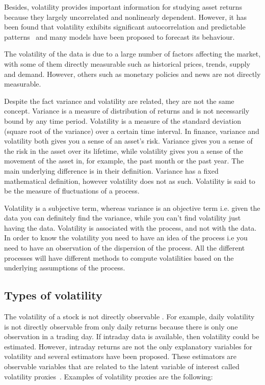 Besides, volatility provides important information for studying asset returns
because they largely uncorrelated and nonlinearly dependent. However,
it has been found that volatility exhibits significant autocorrelation and
predictable patterns~\cite{poon+granger2003} and  many models have been
proposed to forecast its behaviour. 

The volatility of the data is due to a large number of factors affecting the
market, with some of them directly measurable such as historical prices,
trends, supply and demand. However, others such as monetary policies and news
are not directly measurable.

Despite the fact variance and volatility are related, they are not the same
concept. Variance is a measure of distribution of returns and is not necessarily
bound by any time period.  Volatility is a measure of the standard deviation
(square root of the variance) over a certain time interval. In finance, variance
and volatility both gives you a sense of an asset's risk. Variance gives you a
sense of the risk in the asset over its lifetime, while volatility gives you a
sense of the movement of the asset in, for example, the past month or the past
year. The main underlying difference is in their definition. Variance has a
fixed mathematical definition, however volatility does not as such. Volatility
is said to be the measure of fluctuations of a process.

Volatility is a subjective term, whereas variance is an objective term i.e.
given the data you can definitely find the variance, while you can't find
volatility just having the data. Volatility is associated with the process, and
not with the data. In order to know the volatility you need to have an idea of the process i.e you
need to have an observation of the dispersion of the process. All the different
processes will have different methods to compute volatilities based on the
underlying assumptions of the process.  

\subsection{Types of volatility}

The volatility of a stock is not directly observable \cite{tsay2005,engle1993}.
For example, daily volatility is not directly observable from only daily returns
because there is only one observation in a trading day.  If intraday data is
available, then volatility could be estimated. However, intraday returns are not
the only explanatory variables for volatility and several estimators have been
proposed. These estimators are observable variables that are related to the
latent variable of interest called volatility proxies~\cite{devilderetal2007}.
Examples of volatility proxies are the following: 



